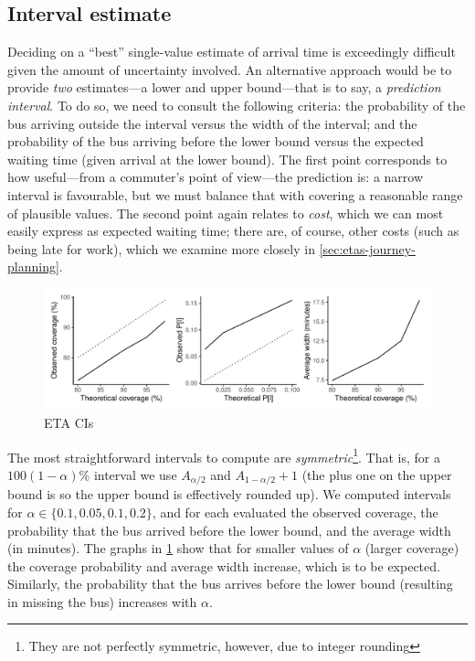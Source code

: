 \subsection{Interval estimate}
\label{sec:etas-interval}


Deciding on a ``best'' single-value estimate of arrival time is exceedingly difficult given the amount of uncertainty involved. An alternative approach would be to provide \emph{two} estimates---a lower and upper bound---that is to say, a \emph{prediction interval}. To do so, we need to consult the following criteria:
the probability of the bus arriving outside the interval versus the width of the interval; and
the probability of the bus arriving before the lower bound versus the expected waiting time (given arrival at the lower bound).
The first point corresponds to how useful---from a commuter's point of view---the prediction is: a narrow interval is favourable, but we must balance that with covering a reasonable range of plausible values. The second point again relates to \emph{cost}, which we can most easily express as expected waiting time; there are, of course, other costs (such as being late for work), which we examine more closely in \cref{sec:etas-journey-planning}.







\begin{knitrout}\small
{}\color{fgcolor}\begin{figure}

{\centering \includegraphics[width=\textwidth]{figure/eta_cis-1} 

}

\caption[ETA CIs]{ETA CIs}\label{fig:eta_cis}
\end{figure}


\end{knitrout}


The most straightforward intervals to compute are \emph{symmetric}\footnote{They are not perfectly symmetric, however, due to integer rounding}. That is, for a \mbox{$100(1-\alpha)$\%} interval we use $A_{\alpha/2}$ and $A_{1-\alpha/2} + 1$ (the plus one on the upper bound is so the upper bound is effectively rounded up). We computed intervals for $\alpha \in \{0.1, 0.05, 0.1, 0.2\}$, and for each evaluated the observed coverage, the probability that the bus arrived before the lower bound, and the average width (in minutes). The graphs in \cref{fig:eta_cis} show that for smaller values of $\alpha$ (larger coverage) the coverage probability and average width increase, which is to be expected. Similarly, the probability that the bus arrives before the lower bound (resulting in missing the bus) increases with $\alpha$.

